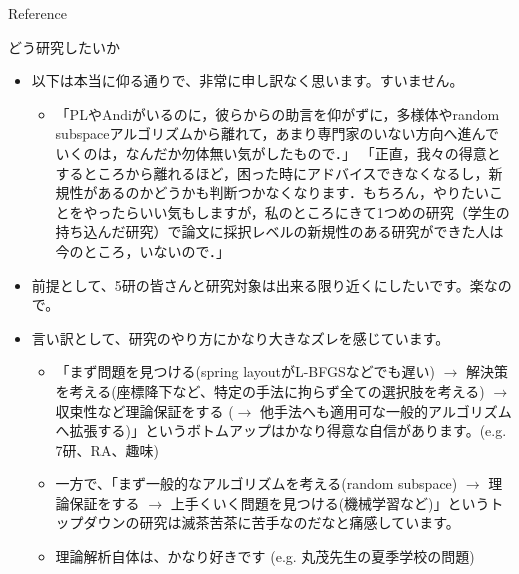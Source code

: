\documentclass[13pt,aspectratio=169,table,dvipdfmx]{beamer}
\newif\ifShowHidden
\begin{document}
\begin{frame}[allowframebreaks]{Reference}
    \scriptsize
    \beamertemplatetextbibitems
    
    
\end{frame}

\ifShowHidden
    \begin{frame}{どう研究したいか}
        \begin{itemize}
            \item 以下は本当に仰る通りで、非常に申し訳なく思います。すいません。
                  \begin{itemize}
                      \item
                            「PLやAndiがいるのに，彼らからの助言を仰がずに，多様体やrandom subspaceアルゴリズムから離れて，あまり専門家のいない方向へ進んでいくのは，なんだか勿体無い気がしたもので．」
                            「正直，我々の得意とするところから離れるほど，困った時にアドバイスできなくなるし，新規性があるのかどうかも判断つかなくなります．もちろん，やりたいことをやったらいい気もしますが，私のところにきて1つめの研究（学生の持ち込んだ研究）で論文に採択レベルの新規性のある研究ができた人は今のところ，いないので．」
                  \end{itemize}
            \item 前提として、5研の皆さんと研究対象は出来る限り近くにしたいです。楽なので。
            \item 言い訳として、研究のやり方にかなり大きなズレを感じています。
                  \begin{itemize}
                      \item 「まず問題を見つける(spring layoutがL-BFGSなどでも遅い) $\to$ 解決策を考える(座標降下など、特定の手法に拘らず全ての選択肢を考える) $\to$ 収束性など理論保証をする ($\to$ 他手法へも適用可な一般的アルゴリズムへ拡張する)」というボトムアップはかなり得意な自信があります。(e.g. 7研、RA、趣味)
                      \item 一方で、「まず一般的なアルゴリズムを考える(random subspace) $\to$ 理論保証をする $\to$ 上手くいく問題を見つける(機械学習など)」というトップダウンの研究は滅茶苦茶に苦手なのだなと痛感しています。
                      \item 理論解析自体は、かなり好きです (e.g. 丸茂先生の夏季学校の問題)
                  \end{itemize}
        \end{itemize}
    \end{frame}
\end{document}
